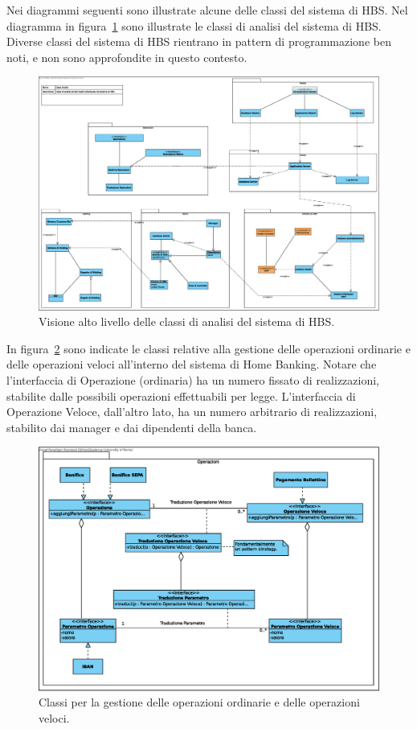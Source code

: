
Nei diagrammi seguenti sono illustrate alcune delle classi del sistema di HBS.
Nel diagramma in figura~\ref{fig:classi-analisi} sono illustrate le classi di analisi del sistema di HBS.
Diverse classi del sistema di HBS rientrano in pattern di programmazione ben noti, e non sono approfondite in questo contesto.

\begin{figure}[h]
	\centering
	\includegraphics[width=\textwidth]{Images/Classi_Analisi.eps}
	\caption{Visione alto livello delle classi di analisi del sistema di HBS.}
	\label{fig:classi-analisi}
\end{figure}

In figura~\ref{fig:operazioni} sono indicate le classi relative alla gestione delle operazioni ordinarie e delle operazioni veloci all'interno del sistema di Home Banking.
Notare che l'interfaccia di Operazione (ordinaria) ha un numero fissato di realizzazioni, stabilite dalle possibili operazioni effettuabili per legge.
L'interfaccia di Operazione Veloce, dall'altro lato, ha un numero arbitrario di realizzazioni, stabilito dai manager e dai dipendenti della banca.

\begin{figure}[h]
	\centering
	\includegraphics[width=\textwidth]{Images/Operazioni.eps}
	\caption{Classi per la gestione delle operazioni ordinarie e delle operazioni veloci.}
	\label{fig:operazioni}
\end{figure}

